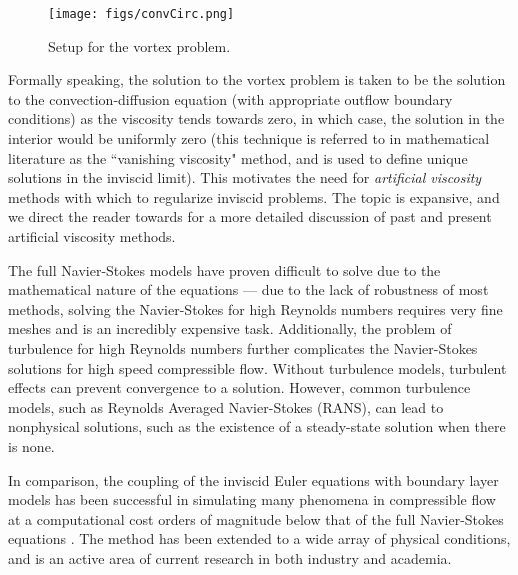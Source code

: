 \begin{figure}[!h]
\centering
\texttt{[image: figs/convCirc.png]}
\caption{Setup for the vortex problem.}
\label{fig:convCirc}
\end{figure}
Formally speaking, the solution to the vortex problem is taken to be the solution to the convection-diffusion equation (with appropriate outflow boundary conditions) as the viscosity tends towards zero, in which case, the solution in the interior would be uniformly zero (this technique is referred to in mathematical literature as the ``vanishing viscosity" method, and is used to define unique solutions in the inviscid limit).  This motivates the need for \emph{artificial viscosity} methods with which to regularize inviscid problems.  The topic is expansive, and we direct the reader towards \cite{Barter} for a more detailed discussion of past and present artificial viscosity methods. 

The full Navier-Stokes models have proven difficult to solve due to the mathematical nature of the equations --- due to the lack of robustness of most methods, solving the Navier-Stokes for high Reynolds numbers requires very fine meshes and is an incredibly expensive task.  Additionally, the problem of turbulence for high Reynolds numbers further complicates the Navier-Stokes solutions for high speed compressible flow.  Without turbulence models, turbulent effects can prevent convergence to a solution.  However, common turbulence models, such as Reynolds Averaged Navier-Stokes (RANS), can lead to nonphysical solutions, such as the existence of a steady-state solution when there is none.  

In comparison, the coupling of the inviscid Euler equations with boundary layer models has been successful in simulating many phenomena in compressible flow at a computational cost orders of magnitude below that of the full Navier-Stokes equations \cite{BoeingDrela}.  The method has been extended to a wide array of physical conditions, and is an active area of current research in both industry and academia.  

